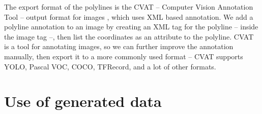 \documentclass{PSAIE}%
\begin{document}
The export format of the polylines is the CVAT -- Computer Vision Annotation Tool -- output format for
images \cite{boris_sekachev_2020_4009388}, which uses XML based annotation. We add a polyline annotation
to an image by creating an XML tag for the polyline -- inside the image tag --, then list the coordinates
as an attribute to the polyline. CVAT is a tool for annotating images, so we can further improve the
annotation manually, then export it to a more commonly used format -- CVAT supports YOLO, Pascal VOC, COCO,
TFRecord, and a lot of other formats.

\section{Use of generated data} \label{sec_use_of_generated_data}



\end{document}
